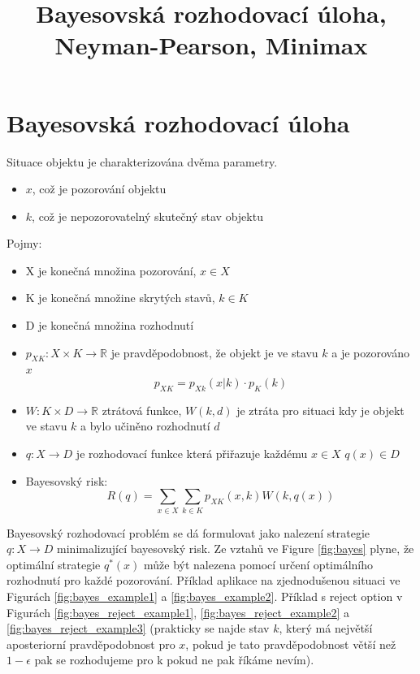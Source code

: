 \documentclass{article}
\begin{document}
\title{Bayesovská rozhodovací úloha, Neyman-Pearson, Minimax}
\maketitle

\section{Bayesovská rozhodovací úloha}

Situace objektu je charakterizována dvěma parametry.
\begin{itemize}
\item $x$, což je pozorování objektu
\item $k$, což je nepozorovatelný skutečný stav objektu
\end{itemize}

Pojmy: 

\begin{itemize}
\item X je konečná množina pozorování, $x \in X$
\item K je konečná množine skrytých stavů, $k \in K$
\item D je konečná množina rozhodnutí
\item $p_{XK}: X \times K \rightarrow \mathbb{R}$ je pravděpodobnost, že objekt je ve stavu $k$ a je pozorováno $x$
\begin{equation}
p_{XK} = p_{Xk}(x|k)\cdot p_K(k)
\end{equation}
\item $W: K \times D \rightarrow \mathbb{R}$ ztrátová funkce, $W(k, d)$ je ztráta pro situaci kdy je objekt ve stavu $k$ a bylo učiněno rozhodnutí $d$
\item $q: X \rightarrow D$ je rozhodovací funkce která přiřazuje každému $x \in X$ $q(x) \in D$
\item Bayesovský risk:
\begin{equation}
R(q) = \displaystyle\sum_{x \in X}\sum_{k \in K}p_{XK}(x, k)W(k,q(x))
\end{equation}
\end{itemize}

Bayesovský rozhodovací problém se dá formulovat jako nalezení strategie $q: X \rightarrow D$ minimalizující bayesovský risk. Ze vztahů ve Figure \ref{fig:bayes} plyne, že optimální strategie $q^*(x)$ může být nalezena pomocí určení optimálního rozhodnutí pro každé pozorování. Příklad aplikace na zjednodušenou situaci ve Figurách \ref{fig:bayes_example1} a \ref{fig:bayes_example2}. Příklad s reject option v Figurách \ref{fig:bayes_reject_example1}, \ref{fig:bayes_reject_example2} a \ref{fig:bayes_reject_example3} (prakticky se najde stav $k$, který má největší aposteriorní pravděpodobnost pro $x$, pokud je tato pravděpodobnost větší než $1 - \epsilon$ pak se rozhodujeme pro k pokud ne pak říkáme nevím).
\end{document}
